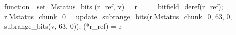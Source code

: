 function _set_Mstatus_bits (r_ref, v) = {
    r = __bitfield_deref(r_ref);
    r.Mstatus_chunk_0 = update_subrange_bits(r.Mstatus_chunk_0, 63, 0, subrange_bits(v, 63, 0));
    (*r_ref) = r
}
